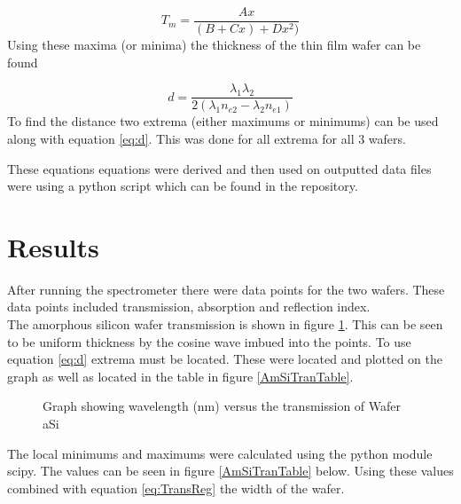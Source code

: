 \documentclass[10pt,a4paper]{article}
\begin{document}
\begin{multicols}{2}
\begin{equation}
\label{eq:Tm}
T_m = \dfrac{Ax}{(B+Cx)+Dx^2)}
\end{equation}
Using these maxima (or minima) the thickness of the thin film wafer can be found 

\begin{equation}
\label{eq:d}
d = \frac{\lambda_1 \lambda_2}{2(\lambda_1 n_{e2} - \lambda_2 n_{e1})}
\end{equation}
To find the distance two extrema (either maximums or minimums) can be used along with equation \ref{eq:d}. This was done for all extrema for all 3 wafers.

These equations equations were derived and then used on outputted data files were using a python script which can be found in the repository.










\section*{Results}
After running the spectrometer there were data points for the two wafers. These data points included transmission, absorption and reflection index.\\
The amorphous silicon wafer transmission is shown in figure \ref{AmSiTran}. This can be seen to be uniform thickness by the cosine wave imbued into the points. To use equation \ref{eq:d} extrema must be located. These were located and plotted on the graph as well as located in the table in figure \ref{AmSiTranTable}.
\begin{figure}[H]
\label{AmSiTran}
\caption{Graph showing wavelength (nm) versus the transmission of Wafer aSi}
\end{figure}

The local minimums and maximums were calculated using the python module scipy. The values can be seen in figure \ref{AmSiTranTable} below. Using these values combined with equation \ref{eq:TransReg} the width of the wafer.



\end{multicols}
\end{document}
